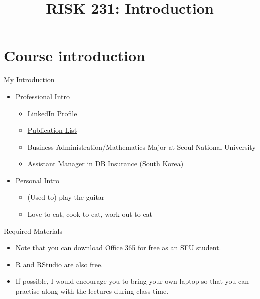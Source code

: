 \documentclass{beamer}
\title{RISK 231: Introduction}
\begin{document}
\maketitle

\section{Course introduction}

\begin{frame}{My Introduction}
\begin{itemize}
  \item Professional Intro
  \begin{itemize}
    \item \href{https://www.linkedin.com/in/himchan-jeong-b5b65110a/?originalSubdomain=ca}{LinkedIn Profile}
    \item \href{https://scholar.google.com/citations?user=WOqS7-8AAAAJ&hl=en}{Publication List}
    \item Business Administration/Mathematics Major at Seoul National University
    \item Assistant Manager in DB Insurance (South Korea)
  \end{itemize}
  \vspace{0.6em}
  \item Personal Intro
  \begin{itemize}
    \item (Used to) play the guitar
    \item Love to eat, cook to eat, work out to eat
  \end{itemize}
\end{itemize}
\end{frame}

\begin{frame}{Required Materials}
\begin{itemize}
  \item Note that you can download Office 365 for free as an SFU student.
  \vspace{0.6em}
  \item R and RStudio are also free.
  \vspace{0.6em}
  \item If possible, I would encourage you to bring your own laptop so that
        you can practise along with the lectures during class time.
\end{itemize}
\end{frame}
\end{document}
